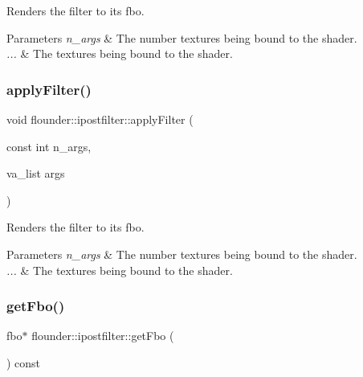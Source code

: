 Renders the filter to its fbo. 


\begin{DoxyParams}{Parameters}
{\em n\+\_\+args} & The number textures being bound to the shader. \\
\hline
{\em ...} & The textures being bound to the shader. \\
\hline
\end{DoxyParams}
\mbox{\label{classflounder_1_1ipostfilter_a59407e666a5f2ae9767b9fc0f0e25ced}} 
\subsubsection{\texorpdfstring{apply\+Filter()}{applyFilter()}\hspace{0.1cm}{\footnotesize\ttfamily [2/2]}}
{\footnotesize\ttfamily void flounder\+::ipostfilter\+::apply\+Filter (\begin{DoxyParamCaption}\item[{const int}]{n\+\_\+args,  }\item[{va\+\_\+list}]{args }\end{DoxyParamCaption})}



Renders the filter to its fbo. 


\begin{DoxyParams}{Parameters}
{\em n\+\_\+args} & The number textures being bound to the shader. \\
\hline
{\em ...} & The textures being bound to the shader. \\
\hline
\end{DoxyParams}
\mbox{\label{classflounder_1_1ipostfilter_ae074e279e1e3c6ddea5df8530802b08b}} 
\subsubsection{\texorpdfstring{get\+Fbo()}{getFbo()}}
{\footnotesize\ttfamily fbo$\ast$ flounder\+::ipostfilter\+::get\+Fbo (\begin{DoxyParamCaption}{ }\end{DoxyParamCaption}) const\hspace{0.3cm}{\ttfamily [inline]}}



